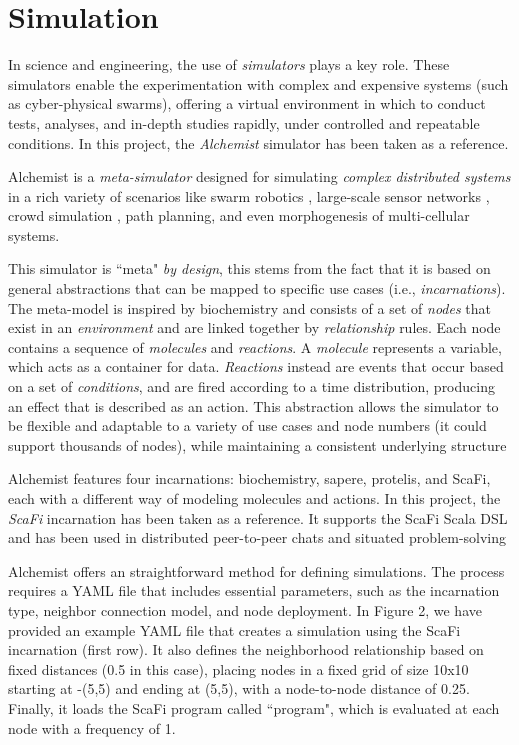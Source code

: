 \documentclass[12pt,a4paper,openright,twoside]{book}
\begin{document}
\section{Simulation}

In science and engineering, the use of \emph{simulators} plays a key role. These simulators enable the experimentation 
    with complex and expensive systems (such as cyber-physical swarms), offering a virtual 
    environment in which to conduct tests, analyses, and in-depth studies rapidly, under controlled and 
    repeatable conditions.
    In this project, the \emph{Alchemist} \cite{alchemist} simulator has been taken as a reference.

Alchemist is a \emph{meta-simulator} designed for simulating \emph{complex distributed systems} in a rich variety of scenarios 
    like swarm robotics \cite{Casadei2021}, large-scale sensor networks \cite{Aguzzi_2022},
    crowd simulation \cite{Beal2015}, path planning, and even morphogenesis of multi-cellular systems.

This simulator is ``meta" \emph{by design}, this stems from the fact that it is based on general abstractions that
    can be mapped to specific use cases (i.e., \emph{incarnations}). The meta-model is inspired by biochemistry
    and consists of a set of \emph{nodes} that exist in an \emph{environment} and are linked together by 
    \emph{relationship} rules.
    Each node contains a sequence of \emph{molecules} and \emph{reactions}. 
    A \emph{molecule} represents a variable, which acts as a container for data. 
    \emph{Reactions} instead are events that occur based on a set of \emph{conditions}, and are fired according 
    to a time distribution, producing an effect that is described as an action. 
    This abstraction allows the simulator to be flexible and adaptable to a variety of use cases and node
    numbers (it could support thousands of nodes), while maintaining a consistent underlying structure

Alchemist features four incarnations: biochemistry, sapere, protelis, and ScaFi, 
    each with a different way of modeling molecules and actions.
    In this project, the \emph{ScaFi} incarnation has been taken as a reference.
    It supports the ScaFi Scala DSL and has been used in distributed peer-to-peer chats and 
    situated problem-solving

Alchemist offers an straightforward method for defining simulations. The process
    requires a YAML file that includes essential parameters, such as the incarnation
    type, neighbor connection model, and node deployment. In Figure 2, we have
    provided an example YAML file that creates a simulation using the ScaFi incarnation (first row). It also defines the neighborhood relationship based on fixed
    distances (0.5 in this case), placing nodes in a fixed grid of size 10x10 starting
    at -(5,5) and ending at (5,5), with a node-to-node distance of 0.25. Finally, it
    loads the ScaFi program called ``program", which is evaluated at each node with
    a frequency of 1.
\end{document}
